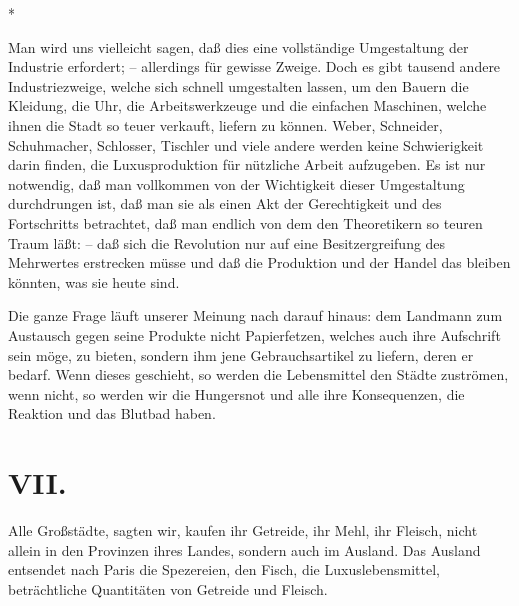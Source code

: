 \documentclass{scrbook}
\begin{document}
\begin{center}*\end{center}

Man wird uns vielleicht sagen, daß dies eine vollständige Umgestaltung der Industrie erfordert; – allerdings für gewisse Zweige. Doch es gibt tausend andere Industriezweige, welche sich schnell umgestalten lassen, um den Bauern die Kleidung, die Uhr, die Arbeitswerkzeuge und die einfachen Maschinen, welche ihnen die Stadt so teuer verkauft, liefern zu können. Weber, Schneider, Schuhmacher, Schlosser, Tischler und viele andere werden keine Schwierigkeit darin finden, die Luxusproduktion für nützliche Arbeit aufzugeben. Es ist nur notwendig, daß man vollkommen von der Wichtigkeit dieser Umgestaltung durchdrungen ist, daß man sie als einen Akt der Gerechtigkeit und des Fortschritts betrachtet, daß man endlich von dem den Theoretikern so teuren Traum läßt: – daß sich die Revolution nur auf eine Besitzergreifung des Mehrwertes erstrecken müsse und daß die Produktion und der Handel das bleiben könnten, was sie heute sind.

Die ganze Frage läuft unserer Meinung nach darauf hinaus: dem Landmann zum Austausch gegen seine Produkte nicht Papierfetzen, welches auch ihre Aufschrift sein möge, zu bieten, sondern ihm jene Gebrauchsartikel zu liefern, deren er bedarf. Wenn dieses geschieht, so werden die Lebensmittel den Städte zuströmen, wenn nicht, so werden wir die Hungersnot und alle ihre Konsequenzen, die Reaktion und das Blutbad haben.

\section*{VII.}

Alle Großstädte, sagten wir, kaufen ihr Getreide, ihr Mehl, ihr Fleisch, nicht allein in den Provinzen ihres Landes, sondern auch im Ausland. Das Ausland entsendet nach Paris die Spezereien, den Fisch, die Luxuslebensmittel, beträchtliche Quantitäten von Getreide und Fleisch.
\end{document}
